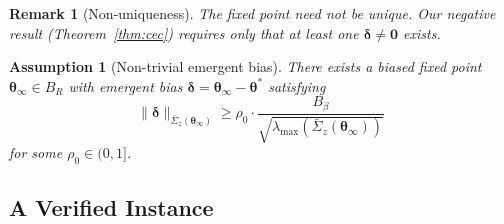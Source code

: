 \documentclass[11pt]{article}
\newtheorem{assumption}[theorem]{Assumption}
\newtheorem{remark}[theorem]{Remark}
\begin{document}
\begin{remark}[Non-uniqueness]\label{rem:nonunique}
The fixed point need not be unique.  Our negative result
(Theorem~\ref{thm:cec}) requires only that at least one
$\bm{\delta}\neq\bm{0}$ exists.
\end{remark}

\begin{assumption}[Non-trivial emergent bias]\label{ass:bias}
There exists a biased fixed point $\bm{\theta}_\infty\in B_R$ with
emergent bias
$\bm{\delta}=\bm{\theta}_\infty-\bm{\theta}^{\!*}$ satisfying
\[
\|\bm{\delta}\|_{\bar{\Sigma}_z(\bm{\theta}_\infty)}
\geq\rho_0\cdot\frac{B_\beta}{\sqrt{\lambda_{\max}(\bar{\Sigma}_z(\bm{\theta}_\infty))}}
\]
for some $\rho_0\in(0,1]$.
\end{assumption}

\subsection{A Verified Instance}\label{sec:instance}
\end{document}
